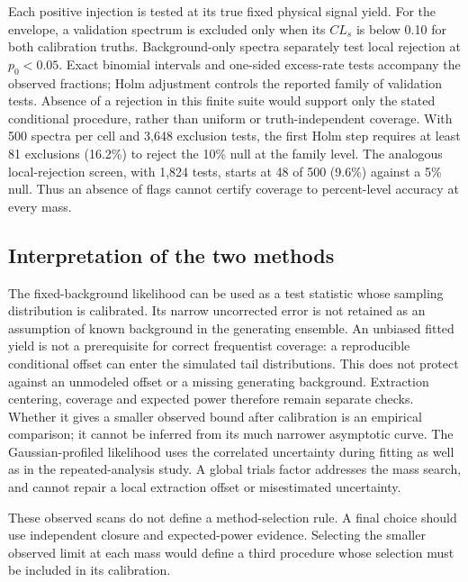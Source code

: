 \clearpage
Each positive injection is tested at its true fixed physical signal yield.
For the envelope, a validation spectrum is excluded only when its
$CL_s$ is below 0.10 for both calibration truths. Background-only spectra
separately test local rejection at $p_0<0.05$. Exact binomial intervals and
one-sided excess-rate tests accompany the observed fractions; Holm
adjustment controls the reported family of validation tests. Absence of a
rejection in this finite suite would support only the stated conditional
procedure, rather than uniform or truth-independent coverage.
With 500 spectra per cell and 3,648 exclusion tests, the first Holm step
requires at least 81 exclusions (16.2\%) to reject the 10\% null at the
family level. The analogous local-rejection screen, with 1,824 tests,
starts at 48 of 500 (9.6\%) against a 5\% null. Thus an absence of flags
cannot certify coverage to percent-level accuracy at every mass.



\clearpage
\subsection{Interpretation of the two methods}


The fixed-background likelihood can be used as a test statistic whose
sampling distribution is calibrated. Its narrow uncorrected error is not
retained as an assumption of known background in the generating ensemble.
An unbiased fitted yield is not a prerequisite for correct frequentist
coverage: a reproducible conditional offset can enter the simulated tail
distributions. This does not protect against an unmodeled offset or a
missing generating background. Extraction centering, coverage and expected
power therefore remain separate checks.
Whether it gives a smaller observed bound after calibration is an empirical
comparison; it cannot be inferred from its much narrower asymptotic curve.
The Gaussian-profiled likelihood uses the correlated uncertainty during
fitting as well as in the repeated-analysis study. A global trials factor
addresses the mass search, and cannot repair a local extraction offset or
misestimated uncertainty.

These observed scans do not define a method-selection rule. A final choice
should use independent closure and expected-power evidence. Selecting the
smaller observed limit at each mass would define a third procedure whose
selection must be included in its calibration.

